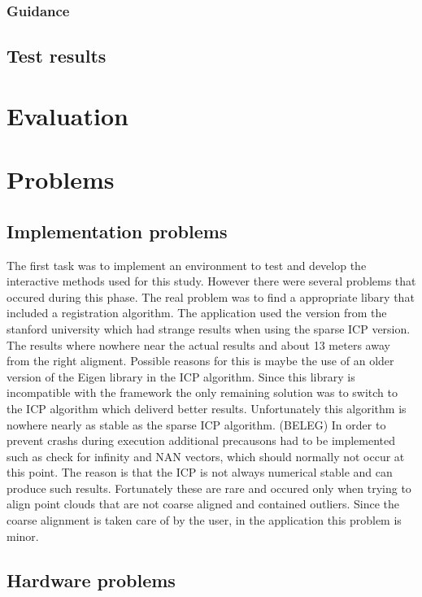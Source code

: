 \documentclass[hyperref,english,bachelorofscience,bibnum]{cgvpub}
\begin{document}
\subsection{Guidance}

\section{Test results}

\chapter{Evaluation}

\chapter{Problems}

\section{Implementation problems}

The first task was to implement an environment to test and develop the interactive methods used for this study.
However there were several problems that occured during this phase. The real problem was to find a appropriate libary that included a registration algorithm. The application used the version from the stanford university which had strange results when using the sparse ICP version. The results where nowhere near the actual results and about 13 meters away from the right aligment. Possible reasons for this is maybe the use of an older version of the Eigen library in the ICP algorithm. Since this library is incompatible with the framework the only remaining solution was to switch to the ICP algorithm which deliverd better results. Unfortunately this algorithm is nowhere nearly as stable as the sparse ICP algorithm. (BELEG) In order to prevent crashs during execution additional precausons had to be implemented such as check for infinity and NAN vectors, which should normally not occur at this point. The reason is that the ICP is not always numerical stable and can produce such results. Fortunately these are rare and occured only when trying to align point clouds that are not coarse aligned and contained outliers. Since the coarse alignment is taken care of by the user, in the application this problem is minor.

\section{Hardware problems}
\end{document}
